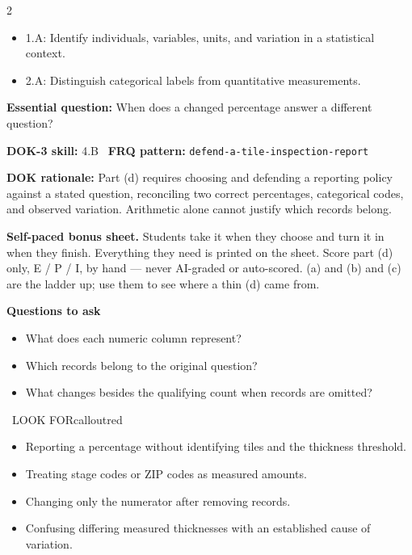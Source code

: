 \documentclass[11pt]{article}
\begin{document}

\begin{multicols}{2}
{\footnotesize\setlength{\parskip}{0pt}
\begin{itemize}[leftmargin=*,itemsep=0pt,topsep=0pt]
\item 1.A: Identify individuals, variables, units, and variation in a statistical context.
\item 2.A: Distinguish categorical labels from quantitative measurements.
\end{itemize}}
\end{multicols}
\clearpage
\small
\textbf{Essential question:} When does a changed percentage answer a different question?\par
\textbf{DOK-3 skill:} 4.B \textperiodcentered\ \textbf{FRQ pattern:} {\small\texttt{defend-\allowbreak{}a-\allowbreak{}tile-\allowbreak{}inspection-\allowbreak{}report}}\par
\textbf{DOK rationale:} Part (d) requires choosing and defending a reporting policy against a stated question, reconciling two correct percentages, categorical codes, and observed variation. Arithmetic alone cannot justify which records belong.\par

\textbf{Self-paced bonus sheet.} Students take it when they choose and turn it in when they finish. Everything they need is printed on the sheet. Score part (d) only, E / P / I, by hand --- never AI-graded or auto-scored. (a) and (b) and (c) are the ladder up; use them to see where a thin (d) came from.\par

\textbf{Questions to ask}
\begin{itemize}[leftmargin=1.5em,itemsep=2pt,topsep=2pt]
  \item What does each numeric column represent?
  \item Which records belong to the original question?
  \item What changes besides the qualifying count when records are omitted?
\end{itemize}

\begin{callout}{\IconWarn\ LOOK FOR}{calloutred}
\begin{itemize}[leftmargin=1.5em,itemsep=2pt,topsep=2pt]
  \item Reporting a percentage without identifying tiles and the thickness threshold.
  \item Treating stage codes or ZIP codes as measured amounts.
  \item Changing only the numerator after removing records.
  \item Confusing differing measured thicknesses with an established cause of variation.
\end{itemize}
\end{callout}
\end{document}
